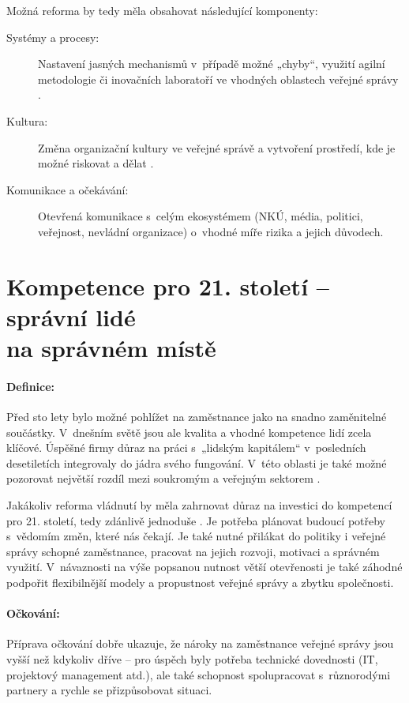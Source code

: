 Možná reforma by tedy měla obsahovat následující komponenty:

\begin{description}
  \item[Systémy a procesy:] Nastavení jasných mechanismů v~případě možné „chyby“, využití agilní metodologie \cite{christopher_blueprint_2021} či inovačních laboratoří ve vhodných oblastech veřejné správy \cite{ministerstvo_pro_mistni_rozvoj_cr_ministerstvo_2020}.
  \item[Kultura:] Změna organizační kultury ve veřejné správě a vytvoření prostředí, kde je možné riskovat a dělat .
  \item[Komunikace a očekávání:] Otevřená komunikace s~celým ekosystémem (NKÚ, média, politici, veřejnost, nevládní organizace) o~vhodné míře rizika a jejich důvodech.
\end{description}

\newpage

\section*{Kompetence pro 21. století -- správní lidé \\ na správném místě}

\paragraph{Definice:} Před sto lety bylo možné pohlížet na zaměstnance jako na snadno za\-mě\-ni\-tel\-né součástky. V~dnešním světě jsou ale kvalita a vhodné kompetence lidí zcela klíčové. Úspěšné firmy důraz na práci s~„lidským kapitálem“ v~posledních desetiletích integrovaly do jádra svého fungování. V~této oblasti je také možné pozorovat největší rozdíl mezi soukromým a veřejným sektorem \cite{d_eggers_future_2020}.

Jakákoliv reforma vládnutí by měla zahrnovat důraz na investici do kompetencí pro 21. století, tedy zdánlivě jednoduše . Je potřeba plánovat budoucí potřeby s~vědomím změn, které nás čekají. Je také nutné přilákat do politiky i veřejné správy schopné zaměstnance, pracovat na jejich rozvoji, motivaci a správném využití. V~návaznosti na výše popsanou nutnost větší otevřenosti je také záhodné podpořit flexibilnější modely a propustnost veřejné správy a zbytku společnosti.

\paragraph{Očkování:} Příprava očkování dobře ukazuje, že nároky na zaměstnance veřejné správy jsou vyšší než kdykoliv dříve -- pro úspěch byly potřeba technické dovednosti (IT, projektový management atd.), ale také schopnost spolupracovat s~různorodými partnery a rychle se přizpůsobovat situaci. 

